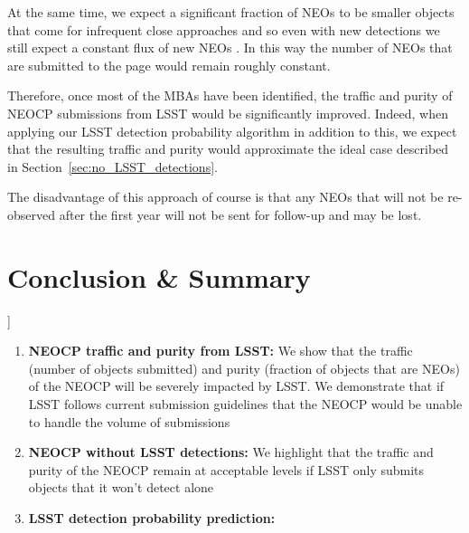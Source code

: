 \documentclass[twocolumn]{aastex631}
\newcommand{\todo}[1]{{\color{red}{[TODO: #1}]}}
\newcommand{\needcite}{{\color{magenta}{(needs citation)}}}
\newcommand{\sss}{S3M}
\newcommand{\mpco}{MPCORB}
\begin{document}
At the same time, we expect a significant fraction of NEOs to be smaller objects that come for infrequent close approaches and so even with new detections we still expect a constant flux of new NEOs \needcite{}. In this way the number of NEOs that are submitted to the page would remain roughly constant.

Therefore, once most of the MBAs have been identified, the traffic and purity of NEOCP submissions from LSST would be significantly improved. Indeed, when applying our LSST detection probability algorithm in addition to this, we expect that the resulting traffic and purity would approximate the ideal case described in Section~\ref{sec:no_LSST_detections}.

The disadvantage of this approach of course is that any NEOs that will not be re-observed after the first year will not be sent for follow-up and may be lost.

\section{Conclusion \& Summary} \label{sec:conclusion}

\todo{Write and summary and spruce up the items below}

\begin{enumerate}
    \item \textbf{NEOCP traffic and purity from LSST:} We show that the traffic (number of objects submitted) and purity (fraction of objects that are NEOs) of the NEOCP will be severely impacted by LSST. We demonstrate that if LSST follows current submission guidelines that the NEOCP would be unable to handle the volume of submissions
    \item \textbf{NEOCP without LSST detections:} We highlight that the traffic and purity of the NEOCP remain at acceptable levels if LSST only submits objects that it won't detect alone
    \item \textbf{LSST detection probability prediction:}
\end{enumerate}
\end{document}
